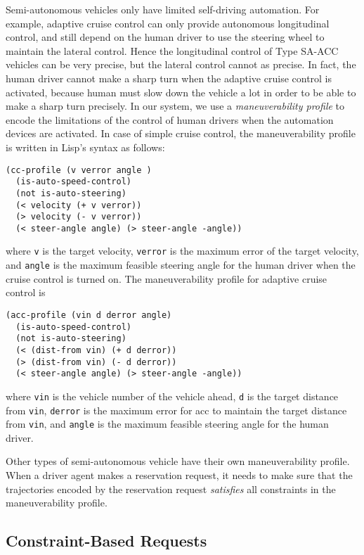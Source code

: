 Semi-autonomous vehicles only have limited self-driving automation.
For example, adaptive cruise control can only provide autonomous
longitudinal control, and still depend on the human driver to use the
steering wheel to maintain the lateral control.  Hence the
longitudinal control of Type SA-ACC vehicles can be very precise, but
the lateral control cannot as precise.  In fact, the human driver
cannot make a sharp turn when the adaptive cruise control is
activated, because human must slow down the vehicle a lot in order to
be able to make a sharp turn precisely.  In our system, we use a
\emph{maneuverability profile} to encode the limitations of the
control of human drivers when the automation devices are activated.
In case of simple cruise control, the maneuverability profile is
written in Lisp's syntax as follows:
{\small
\begin{verbatim}
(cc-profile (v verror angle )
  (is-auto-speed-control)
  (not is-auto-steering)
  (< velocity (+ v verror))
  (> velocity (- v verror))
  (< steer-angle angle) (> steer-angle -angle))
\end{verbatim}
}
where \texttt{v} is the target velocity, \texttt{verror} is the
maximum error of the target velocity, and \texttt{angle} is the
maximum feasible steering angle for the human driver when the cruise
control is turned on.  The maneuverability profile for adaptive cruise
control is
{\small
\begin{verbatim}
(acc-profile (vin d derror angle)
  (is-auto-speed-control)
  (not is-auto-steering)
  (< (dist-from vin) (+ d derror))
  (> (dist-from vin) (- d derror))
  (< steer-angle angle) (> steer-angle -angle))
\end{verbatim}
}
where \texttt{vin} is the vehicle number of the vehicle ahead,
\texttt{d} is the target distance from \texttt{vin}, \texttt{derror}
is the maximum error for acc to maintain the target distance from
\texttt{vin}, and \texttt{angle} is the maximum feasible steering
angle for the human driver.

Other types of semi-autonomous vehicle have their own maneuverability
profile.  When a driver agent makes a reservation request, it needs to
make sure that the trajectories encoded by the reservation request
\emph{satisfies} all constraints in the maneuverability profile.

\subsection{Constraint-Based Requests}

